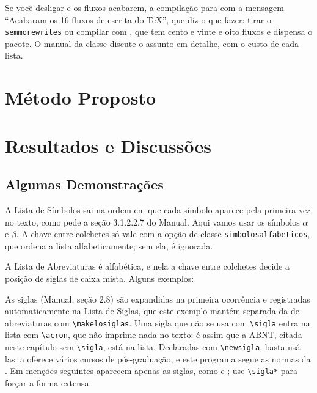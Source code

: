 \documentclass[dsc,pdfa]{coppe}
\begin{document}
  Se você desligar e os fluxos acabarem, a compilação para com a mensagem ``Acabaram os 16 fluxos de escrita do \TeX'', que diz o que fazer: tirar o \verb|semmorewrites| ou compilar com , que tem cento e vinte e oito fluxos e dispensa o pacote. O manual da classe discute o assunto em detalhe, com o custo de cada lista.

  \chapter{Método Proposto}
  \chapter{Resultados e Discussões}

  \section{Algumas Demonstrações}

  A Lista de Símbolos sai na ordem em que cada símbolo aparece pela primeira vez no texto, como pede a seção 3.1.2.2.7 do Manual. Aqui vamos usar os símbolos $\alpha$ e $\beta$. A chave entre colchetes só vale com a opção de classe \verb|simbolosalfabeticos|, que ordena a lista alfabeticamente; sem ela, é ignorada.

  A Lista de Abreviaturas é alfabética, e nela a chave entre colchetes decide a posição de siglas de caixa mista. Alguns exemplos:


  As siglas (Manual, seção 2.8) são expandidas na primeira ocorrência e registradas automaticamente na Lista de Siglas, que este exemplo mantém separada da de abreviaturas com \verb|\makelosiglas|. Uma sigla que não se usa com \verb|\sigla| entra na lista com \verb|\acron|, que não imprime nada no texto: é assim que a ABNT, citada neste capítulo sem \verb|\sigla|, está na lista. Declaradas com \verb|\newsigla|, basta usá-las: a  oferece vários cursos de pós-graduação, e este programa segue as normas da . Em menções seguintes aparecem apenas as siglas, como  e ; use \verb|\sigla*| para forçar a forma extensa.
\end{document}
